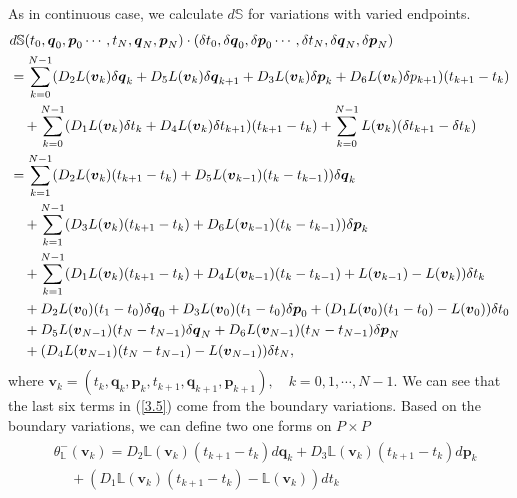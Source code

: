 \documentclass[a4paper,a4paper]{article}
\def\q{\boldsymbol{q}}
\def\p{\boldsymbol{p}}
\def\w{\boldsymbol{v}}
\begin{document}
As in continuous case, we calculate $d\mathbb{S}$ for variations with varied
endpoints.
\begin{align}
 &d\mathbb{S}(t_{0}, \q_{0}, \p_{0} \cdots, t_{N}, \q_{N}, \p_{N})\cdot
         (\delta t_{0}, \delta \q_{0}, \delta \p_{0}
         \cdots, \delta t_{N}, \delta \q_{N}, \delta \p_{N})\notag \\
  &=\sum_{k=0}^{N-1}(D_{2}L(\w_{k})\delta \q_{k}+
        D_{5}L(\w_{k})\delta \q_{k+1}+D_{3}L(\w_{k})\delta \p_{k}+
        D_{6}L(\w_{k})\delta p_{k+1})(t_{k+1}-t_{k})\notag \\
     &\quad + \sum_{k=0}^{N-1}(D_{1}L(\w_{k})\delta t_{k}+
        D_{4}L(\w_{k})\delta t_{k+1})(t_{k+1}-t_{k})+\sum_{k=0}^{N-1}L(\w_{k})(\delta t_{k+1}
       -\delta t_{k})\notag\\
   &=\sum_{k=1}^{N-1}(D_{2}L(\w_{k})(t_{k+1}-t_{k})
                     +D_{5}L(\w_{k-1})(t_{k}-t_{k-1}))\delta \q_{k}\notag\\
                    &\quad +\sum_{k=1}^{N-1}
                     (D_{3}L(\w_{k})(t_{k+1}-t_{k})
                     +D_{6}L(\w_{k-1})(t_{k}-t_{k-1}))\delta \p_{k}\notag\\
    &\quad +\sum_{k=1}^{N-1}(D_{1}L(\w_{k})(t_{k+1}-t_{k})
                     +D_{4}L(\w_{k-1})(t_{k}-t_{k-1})+L(\w_{k-1})-L(\w_{k})
                      )\delta t_{k}\notag\\
    &\quad +D_{2}L(\w_{0})(t_{1}-t_{0})\delta \q_{0}+D_{3}L(\w_{0})
                    (t_{1}-t_{0})\delta \p_{0}
            +(D_{1}L(\w_{0})(t_{1}-t_{0})-L(\w_{0}))\delta t_{0}\notag\\
      &\quad +D_{5}L(\w_{N-1})(t_{N}-t_{N-1})\delta \q_{N}+D_{6}L(\w_{N-1})
               (t_{N}-t_{N-1})\delta \p_{N}\notag\\
       &\quad +(D_{4}L(\w_{N-1})(t_{N}-t_{N-1})-L(\w_{N-1}))\delta t_{N},  \label{3.5}
\end{align}
where $\w_{k}=(t_{k}, \q_{k}, \p_{k}, t_{k+1}, \q_{k+1},
\p_{k+1}), \quad k=0, 1, \cdots, N-1$. We can see that the last
six terms in (\ref{3.5}) come from the boundary variations. Based
on the boundary variations, we can define two one forms on
$P\times P$
\begin{align}
\begin{split}
&\theta_{\mathbb{L}}^{-}(\w_{k})
           =D_{2}\mathbb{L}(\w_{k})(t_{k+1}-t_{k}) d\q_{k}
             +D_{3}\mathbb{L}(\w_{k})(t_{k+1}-t_{k}) d\p_{k}\\
      &\, \quad +(D_{1}\mathbb{L}(\w_{k})(t_{k+1}-t_{k})
            -\mathbb{L}(\w_{k}))dt_{k} \label{3.6}
\end{split}
\end{align}
\end{document}
